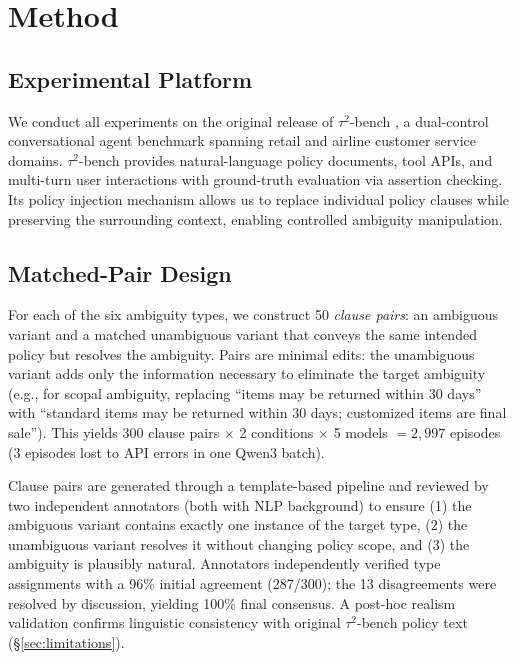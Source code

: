 \section{Method}
\label{sec:method}

\subsection{Experimental Platform}

We conduct all experiments on the original release of $\tau^2$-bench \citep{tau2_bench_2025}, a dual-control conversational agent benchmark spanning retail and airline customer service domains. $\tau^2$-bench provides natural-language policy documents, tool APIs, and multi-turn user interactions with ground-truth evaluation via assertion checking. Its policy injection mechanism allows us to replace individual policy clauses while preserving the surrounding context, enabling controlled ambiguity manipulation.

\subsection{Matched-Pair Design}

For each of the six ambiguity types, we construct 50 \emph{clause pairs}: an ambiguous variant and a matched unambiguous variant that conveys the same intended policy but resolves the ambiguity. Pairs are minimal edits: the unambiguous variant adds only the information necessary to eliminate the target ambiguity (e.g., for scopal ambiguity, replacing ``items may be returned within 30 days'' with ``standard items may be returned within 30 days; customized items are final sale''). This yields 300 clause pairs $\times$ 2 conditions $\times$ 5 models $= 2{,}997$ episodes (3 episodes lost to API errors in one Qwen3 batch).

Clause pairs are generated through a template-based pipeline and reviewed by two independent annotators (both with NLP background) to ensure (1) the ambiguous variant contains exactly one instance of the target type, (2) the unambiguous variant resolves it without changing policy scope, and (3) the ambiguity is plausibly natural. Annotators independently verified type assignments with a 96\% initial agreement (287/300); the 13 disagreements were resolved by discussion, yielding 100\% final consensus. A post-hoc realism validation confirms linguistic consistency with original $\tau^2$-bench policy text (\S\ref{sec:limitations}).

